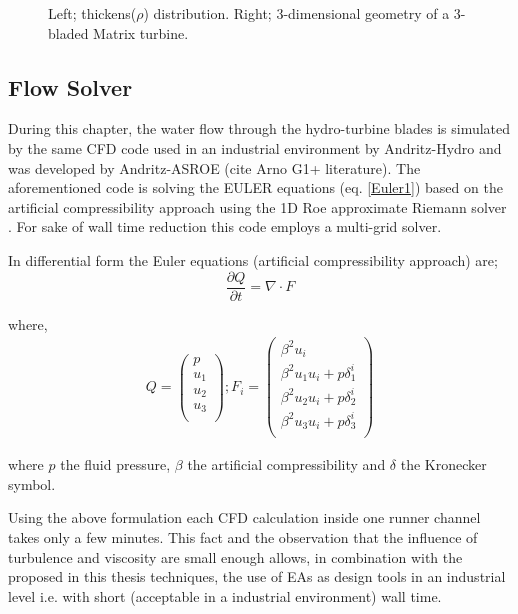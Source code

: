 \begin{figure}[h!]
\begin{minipage}[b]{0.5\linewidth}
\end{minipage}
\caption{Left; thickens($\rho$) distribution. Right; 3-dimensional geometry of a 3-bladed Matrix turbine.}
\label{param10}
\end{figure}

\subsection{Flow Solver}
\label{FlowSolvert}
During this chapter, the water flow through the hydro-turbine blades is simulated by the same CFD code used in an industrial environment by Andritz-Hydro and was developed by Andritz-ASROE (cite Arno G1+ literature). The aforementioned code is solving the EULER equations (eq. \ref{Euler1}) based on the artificial compressibility approach using the 1D Roe approximate Riemann solver \cite{Roe81}. For sake of wall time reduction this code employs a multi-grid solver. 

In differential form the Euler equations (artificial compressibility approach) are;
\begin{equation} 
    \frac{\partial Q}{\partial t}=\nabla \cdot F
	\label{Euler1}
\end{equation}

where,
\begin{eqnarray}
		Q= \left( {\begin{array}{c}
 		p    \\
 		u_1  \\
 		u_2  \\
 		u_3  \\
 		\end{array} } \right)
 		;
 		F_i= \left( {\begin{array}{c}
 		\beta ^2 u_i    \\
 		\beta ^2 u_1u_i + p\delta _1^i  \\
		\beta ^2 u_2u_i + p\delta _2^i  \\
 		\beta ^2 u_3u_i + p\delta _3^i  \\
 		\end{array} } \right)
\label{Euler3}
\end{eqnarray} 
 
where $p$ the fluid pressure, $\beta$ the artificial compressibility and $\delta$ the Kronecker symbol.

Using the above formulation each CFD calculation inside one runner channel takes only a few minutes. This fact and the observation that the influence of turbulence and viscosity are small enough allows, in combination with the proposed in this thesis techniques, the use of EAs as design tools in an industrial level i.e. with short (acceptable in a industrial environment) wall time. 

